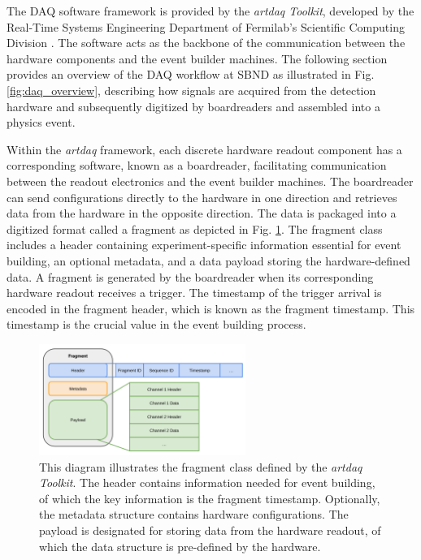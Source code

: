 The DAQ software framework is provided by the \textit{artdaq Toolkit}, developed by the Real-Time Systems Engineering Department of Fermilab's Scientific Computing Division \cite{artdaq_note}.
The software acts as the backbone of the communication between the hardware components and the event builder machines.
The following section provides an overview of the DAQ workflow at SBND as illustrated in Fig. \ref{fig:daq_overview}, describing how signals are acquired from the detection hardware and subsequently digitized by boardreaders and assembled into a physics event.

Within the \textit{artdaq} framework, each discrete hardware readout component has a corresponding software, known as a boardreader, facilitating communication between the readout electronics and the event builder machines.
The boardreader can send configurations directly to the hardware in one direction and retrieves data from the hardware in the opposite direction.
The data is packaged into a digitized format called a fragment as depicted in Fig. \ref{fig:fragment_diagram}. 
The fragment class includes a header containing experiment-specific information essential for event building, an optional metadata, and a data payload storing the hardware-defined data.
A fragment is generated by the boardreader when its corresponding hardware readout receives a trigger.
The timestamp of the trigger arrival is encoded in the fragment header, which is known as the fragment timestamp.
This timestamp is the crucial value in the event building process.

\begin{figure}[htbp!] 
\centering    
\includegraphics[width=0.6\textwidth]{Fragment_Diagram}
\caption[Fragment_Diagram]{This diagram illustrates the fragment class defined by the \textit{artdaq Toolkit}. The header contains information needed for event building, of which the key information is the fragment timestamp. Optionally, the metadata structure contains hardware configurations. The payload is designated for storing data from the hardware readout, of which the data structure is pre-defined by the hardware. }
\label{fig:fragment_diagram}
\end{figure}

